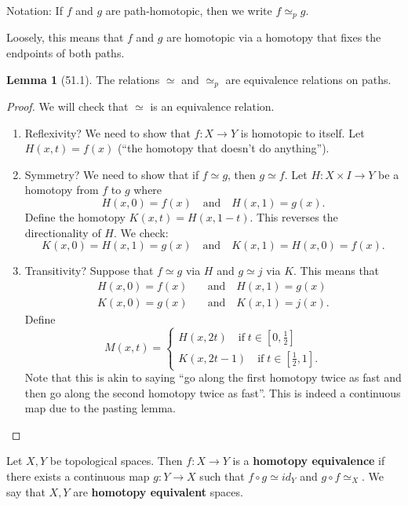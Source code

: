 \documentclass{article}
\newcommand{\nline}{\vspace*{0.5\baselineskip}}
\theoremstyle{definition}
\newtheorem{lemma}{Lemma}[subsection]
\begin{document}
\begin{flushleft}
\nline

Notation: If $f$ and $g$ are path-homotopic, then we write $f \simeq_p g$.

\nline

Loosely, this means that $f$ and $g$ are homotopic via a homotopy that fixes the endpoints of both paths.

\begin{lemma}[51.1]
The relations $\simeq$ and $\simeq_p$ are equivalence relations on paths.
\end{lemma}

\begin{proof}
We will check that $\simeq$ is an equivalence relation.

\begin{enumerate}
    \item Reflexivity? We need to show that $f : X \to Y$ is homotopic to itself. Let $H(x, t) = f(x)$ (``the homotopy that doesn't do anything'').
    \item Symmetry? We need to show that if $f \simeq g$, then $g \simeq f$. Let $H: X \times I \to Y$ be a homotopy from $f$ to $g$ where
    \[
    H(x, 0) = f(x) \quad \text{and} \quad H(x, 1) = g(x).
    \]
    Define the homotopy $K(x, t) = H(x, 1-t)$. This reverses the directionality of $H$. We check:
    \[
    K(x, 0) = H(x, 1) = g(x) \quad \text{and} \quad K(x,1) = H(x, 0) = f(x).
    \]
    \item Transitivity? Suppose that $f \simeq g$ via $H$ and $g \simeq j$ via $K$. This means that
    \[
    \begin{align}
        H(x, 0) = f(x) \quad &\text{and} \quad H(x, 1) = g(x) \\
        K(x, 0) = g(x) \quad &\text{and} \quad K(x, 1) = j(x).
    \end{align}
    \]
    Define
    \[
    M(x, t) = \begin{cases}
    H(x, 2t) \quad \text{if} \; t \in [0, \frac{1}{2}] \\
    K(x, 2t - 1) \quad \text{if} \; t \in [\frac{1}{2}, 1].
    \end{cases}
    \]
    Note that this is akin to saying ``go along the first homotopy twice as fast and then go along the second homotopy twice as fast''. This is indeed a continuous map due to the pasting lemma.
\end{enumerate}
\end{proof}

Let $X, Y$ be topological spaces. Then $f : X \to Y$ is a \textbf{homotopy equivalence} if there exists a continuous map $g : Y \to X$ such that $f \circ g \simeq id_Y$ and $g \circ f \simeq_X$. We say that $X, Y$ are \textbf{homotopy equivalent} spaces.


\end{flushleft}
\end{document}
